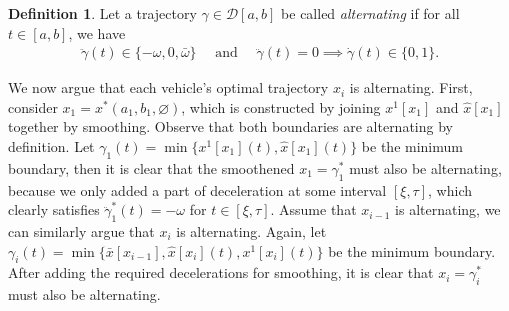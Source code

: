 \documentclass[a4paper]{report}
\theoremstyle{definition}
\newtheorem{define}{Definition}[chapter]
\theoremstyle{plain}
\begin{document}
\begin{define}
  Let a trajectory $\gamma \in \mathcal{D}[a, b]$ be called \emph{alternating} if for all
  $t \in [a, b]$, we have
  \begin{align}
    \ddot{\gamma}(t) \in \{-\omega, 0, \bar{\omega}\} \quad \text{ and } \quad
    \ddot{\gamma}(t) = 0 \implies \dot{\gamma}(t) \in \{0, 1\}.
  \end{align}
\end{define}

We now argue that each vehicle's optimal trajectory $x_{i}$ is alternating.
First, consider $x_{1} = x^{*}(a_{1}, b_{1}, \varnothing)$, which is
constructed by joining $x^{1}[x_{1}]$ and $\hat{x}[x_{1}]$ together by smoothing. Observe that both boundaries are alternating by definition. Let
$\gamma_{1}(t) = \min\{x^{1}[x_{1}](t), \hat{x}[x_{1}](t) \}$ be the minimum boundary,
then it is clear that the smoothened $x_{1} = \gamma_{1}^{*}$ must also be
alternating, because we only added a part of deceleration at some interval
$[\xi, \tau]$, which clearly satisfies $\ddot{\gamma}_{1}^{*}(t) = -\omega$ for
$t \in [\xi,\tau]$.
%
Assume that $x_{i-1}$ is alternating, we can similarly argue that $x_{i}$ is
alternating. Again, let
$\gamma_{i}(t) = \min\{\bar{x}[x_{i-1}], \hat{x}[x_{i}](t), x^{1}[x_{i}](t)\}$ be the
minimum boundary. After adding the required decelerations for smoothing, it is
clear that $x_{i} = \gamma^{*}_{i}$ must also be alternating.
\end{document}

